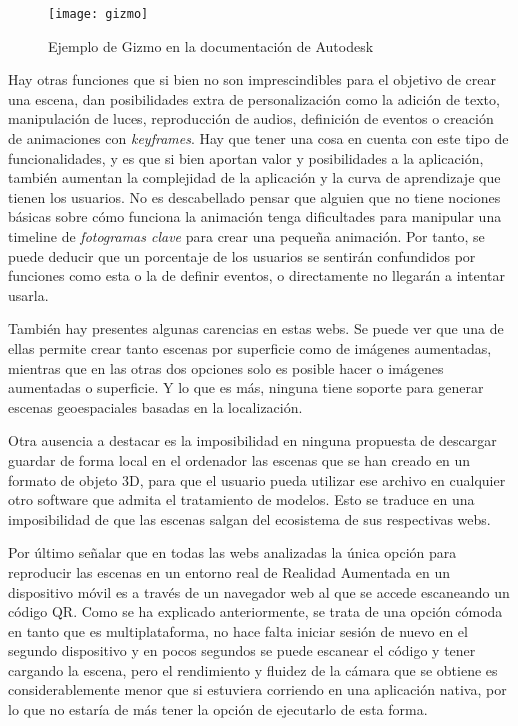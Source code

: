 \begin{figure}[h]
    \centering
    \texttt{[image: gizmo]}
    \caption[Gizmo en Autodesk AutoCAD]{Ejemplo de Gizmo en la documentación de Autodesk}
\end{figure}

Hay otras funciones que si bien no son imprescindibles para el objetivo de crear una escena, dan posibilidades extra de personalización como la adición de texto, manipulación de luces, reproducción de audios, definición de eventos o creación de animaciones con \textit{keyframes}. Hay que tener una cosa en cuenta con este tipo de funcionalidades, y es que si bien aportan valor y posibilidades a la aplicación, también aumentan la complejidad de la aplicación y la curva de aprendizaje que tienen los usuarios. No es descabellado pensar que alguien que no tiene nociones básicas sobre cómo funciona la animación tenga dificultades para manipular una timeline de \textit{fotogramas clave} para crear una pequeña animación. Por tanto, se puede deducir que un porcentaje de los usuarios se sentirán confundidos por funciones como esta o la de definir eventos, o directamente no llegarán a intentar usarla.

También hay presentes algunas carencias en estas webs. Se puede ver que una de ellas permite crear tanto escenas por superficie como de imágenes aumentadas, mientras que en las otras dos opciones solo es posible hacer o imágenes aumentadas o superficie. Y lo que es más, ninguna tiene soporte para generar escenas geoespaciales basadas en la localización.

Otra ausencia a destacar es la imposibilidad en ninguna propuesta de descargar guardar de forma local en el ordenador las escenas que se han creado en un formato de objeto 3D, para que el usuario pueda utilizar ese archivo en cualquier otro software que admita el tratamiento de modelos. Esto se traduce en una imposibilidad de que las escenas salgan del ecosistema de sus respectivas webs.

Por último señalar que en todas las webs analizadas la única opción para reproducir las escenas en un entorno real de Realidad Aumentada en un dispositivo móvil es a través de un navegador web al que se accede escaneando un código QR. Como se ha explicado anteriormente, se trata de una opción cómoda en tanto que es multiplataforma, no hace falta iniciar sesión de nuevo en el segundo dispositivo y en pocos segundos se puede escanear el código y tener cargando la escena, pero el rendimiento y fluidez de la cámara que se obtiene es considerablemente menor que si estuviera corriendo en una aplicación nativa, por lo que no estaría de más tener la opción de ejecutarlo de esta forma.

